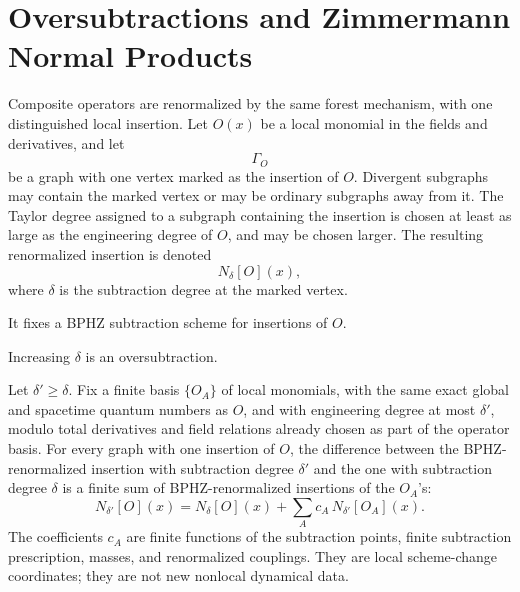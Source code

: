 \section{Oversubtractions and Zimmermann Normal Products}

Composite operators are renormalized by the same forest mechanism, with one
distinguished local insertion.  Let \(O(x)\) be a local monomial in the fields
and derivatives, and let
\[
  \Gamma_O
\]
be a graph with one vertex marked as the insertion of \(O\).  Divergent
subgraphs may contain the marked vertex or may be ordinary subgraphs away from
it.  The Taylor degree assigned to a subgraph containing the insertion is
chosen at least as large as the engineering degree of \(O\), and may be chosen
larger.  The resulting renormalized insertion is denoted
\[
  N_\delta[O](x),
\]
where \(\delta\) is the subtraction degree at the marked vertex.

It fixes a BPHZ subtraction scheme for insertions of \(O\).

Increasing \(\delta\) is an oversubtraction.

\begin{proposition}
\label{prop:zimmermann-normal-product-identity}
Let \(\delta'\ge\delta\).  Fix a finite basis \(\{O_A\}\) of local monomials,
with the same exact global and spacetime quantum numbers as \(O\), and with
engineering degree at most \(\delta'\), modulo total derivatives and field
relations already chosen as part of the operator basis.  For every graph with
one insertion of \(O\), the difference between the BPHZ-renormalized
insertion with subtraction degree \(\delta'\) and the one with subtraction
degree \(\delta\) is a finite sum of BPHZ-renormalized insertions of the
\(O_A\)'s:
\begin{equation}
  N_{\delta'}[O](x)
  =
  N_\delta[O](x)
  +
  \sum_A c_A\,N_{\delta'}[O_A](x).
  \label{eq:zimmermann-normal-product-identity}
\end{equation}
The coefficients \(c_A\) are finite functions of the subtraction points,
finite subtraction prescription, masses, and renormalized couplings.  They
are local scheme-change coordinates; they are not new nonlocal dynamical data.
\end{proposition}

